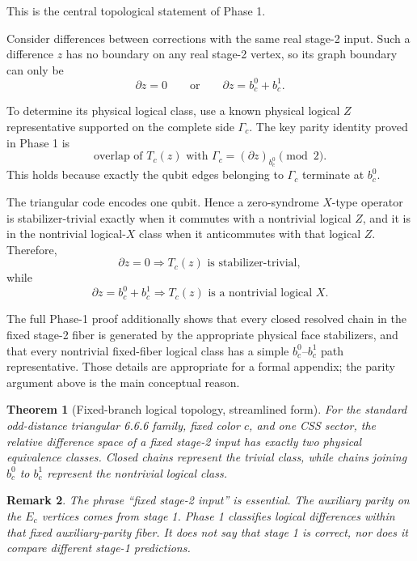 \documentclass[11pt]{article}
\newtheorem{theorem}{Theorem}[section]
\newtheorem{remark}[theorem]{Remark}
\begin{document}
This is the central topological statement of Phase 1.

Consider differences between corrections with the same real stage-2 input.
Such a difference $z$ has no boundary on any real stage-2 vertex, so its graph
boundary can only be
\[
  \partial z=0
  \qquad\text{or}\qquad
  \partial z=b_c^0+b_c^1.
\]

To determine its physical logical class, use a known physical logical $Z$
representative supported on the complete side $\Gamma_c$. The key parity
identity proved in Phase 1 is
\[
  \text{overlap of }T_c(z)\text{ with }\Gamma_c
  =
  (\partial z)_{b_c^0}
  \pmod 2.
\]
This holds because exactly the qubit edges belonging to $\Gamma_c$ terminate
at $b_c^0$.

The triangular code encodes one qubit. Hence a zero-syndrome $X$-type
operator is stabilizer-trivial exactly when it commutes with a nontrivial
logical $Z$, and it is in the nontrivial logical-$X$ class when it
anticommutes with that logical $Z$. Therefore,
\[
  \boxed{
  \partial z=0
  \Longrightarrow
  T_c(z)\text{ is stabilizer-trivial},
  }
\]
while
\[
  \boxed{
  \partial z=b_c^0+b_c^1
  \Longrightarrow
  T_c(z)\text{ is a nontrivial logical }X.
  }
\]

The full Phase-1 proof additionally shows that every closed resolved chain in
the fixed stage-2 fiber is generated by the appropriate physical face
stabilizers, and that every nontrivial fixed-fiber logical class has a simple
$b_c^0$--$b_c^1$ path representative. Those details are appropriate for a
formal appendix; the parity argument above is the main conceptual reason.

\begin{theorem}[Fixed-branch logical topology, streamlined form]
For the standard odd-distance triangular 6.6.6 family, fixed color $c$, and
one CSS sector, the relative difference space of a fixed stage-2 input has
exactly two physical equivalence classes. Closed chains represent the trivial
class, while chains joining $b_c^0$ to $b_c^1$ represent the nontrivial
logical class.
\end{theorem}

\begin{remark}
The phrase ``fixed stage-2 input'' is essential. The auxiliary parity on the
$E_c$ vertices comes from stage 1. Phase 1 classifies logical differences
\emph{within that fixed auxiliary-parity fiber}. It does not say that stage 1
is correct, nor does it compare different stage-1 predictions.
\end{remark}
\end{document}
